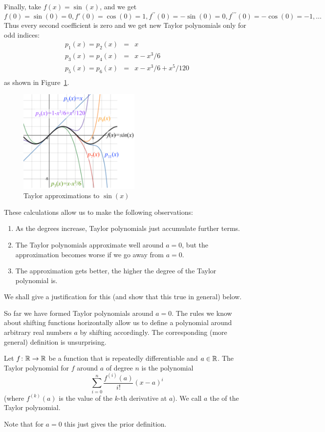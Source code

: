 Finally, take $f(x)=\sin(x)$, and we get
\[
f(0)=\sin(0)=0, f'(0)=\cos(0)=1,
f^{\prime\prime}(0)=-\sin(0)=0,
f^{\prime\prime\prime}(0)=-\cos(0)=-1,\ldots
\]
Thus every second coefficient is zero and we get new Taylor polynomials only
for odd indices:
\begin{eqnarray*}
p_1(x)=p_2(x)&=&x\\
p_3(x)=p_4(x)&=&x-x^3/6\\
p_5(x)=p_6(x)&=&x-x^3/6+x^5/120\\
\end{eqnarray*}
as shown in Figure~\ref{figtaysin}.
\begin{figure}
\begin{center}
\includegraphics[width=6cm]{pic/TaylorSin.pdf}
\end{center}
\caption{Taylor approximations to $\sin(x)$}
\label{figtaysin}
\end{figure}
These calculations allow us to make the following observations:
\begin{enumerate}
\item As the degrees increase, Taylor polynomials just accumulate further
terms.
\item The Taylor polynomials approximate well around $a=0$, but the
approximation becomes worse if we go away from $a=0$.
\item The approximation gets better, the higher the degree of the Taylor
polynomial is.
\end{enumerate}
We shall give a justification for this (and show that this true in general)
below.
\bigskip

So far we have formed Taylor polynomials around $a=0$. The rules we know
about shifting functions horizontally allow us to define a polynomial around
arbitrary real numbers $a$ by shifting accordingly. The corresponding (more
general) definition is unsurprising.
\begin{defn}
Let $f\colon{\mathbb R}\to{\mathbb R}$ be a function that is repeatedly differentiable
and $a\in{\mathbb R}$.
The Taylor polynomial for $f$ around $a$ of degree $n$ is the polynomial
\[
\sum_{i=0}^n\frac{f^{(i)}(a)}{i!} (x-a)^i
\]
(where $f^{(k)}(a)$ is the value of the $k$-th derivative at $a$). We call $a$
the  of the Taylor polynomial.
\end{defn}
Note that for $a=0$ this just gives the prior definition.

